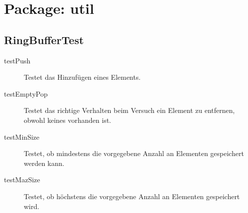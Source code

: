 \section{Package: util}

\subsection{RingBufferTest}

\begin{description}
\item[testPush]
Testet das Hinzufügen eines Elements.

\item[testEmptyPop]
Testet das richtige Verhalten beim Versuch ein Element zu entfernen, obwohl keines vorhanden ist.

\item[testMinSize]
Testet, ob mindestens die vorgegebene Anzahl an Elementen gespeichert werden kann.

\item[testMazSize]
Testet, ob höchstens die vorgegebene Anzahl an Elementen gespeichert wird.

\end{description}

